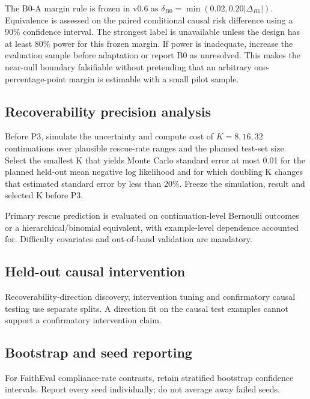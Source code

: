 The B0-A margin rule is frozen in v0.6 as \(\delta_{B0}=\min(0.02,0.20|\Delta_{R1}|)\). Equivalence is assessed on the paired conditional causal risk difference using a 90\% confidence interval. The strongest label is unavailable unless the design has at least 80\% power for this frozen margin. If power is inadequate, increase the evaluation sample before adaptation or report B0 as unresolved. This makes the near-null boundary falsifiable without pretending that an arbitrary one-percentage-point margin is estimable with a small pilot sample.

\subsection{Recoverability precision analysis}\label{recoverability-precision-analysis}

Before P3, simulate the uncertainty and compute cost of \(K=8,16,32\) continuations over plausible rescue-rate ranges and the planned test-set size. Select the smallest K that yields Monte Carlo standard error at most 0.01 for the planned held-out mean negative log likelihood and for which doubling K changes that estimated standard error by less than 20\%. Freeze the simulation, result and selected K before P3.

Primary rescue prediction is evaluated on continuation-level Bernoulli outcomes or a hierarchical/binomial equivalent, with example-level dependence accounted for. Difficulty covariates and out-of-band validation are mandatory.

\subsection{Held-out causal intervention}\label{held-out-causal-intervention}

Recoverability-direction discovery, intervention tuning and confirmatory causal testing use separate splits. A direction fit on the causal test examples cannot support a confirmatory intervention claim.

\subsection{Bootstrap and seed reporting}\label{bootstrap-policy-for-pilot-causal-effects}

For FaithEval compliance-rate contrasts, retain stratified bootstrap confidence intervals. Report every seed individually; do not average away failed seeds.


